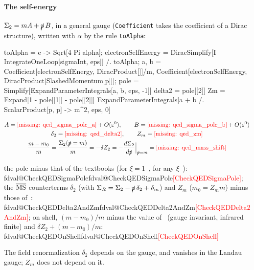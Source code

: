 \documentclass[11pt,a4paper]{article}
\makeatletter
\newcommand{\formula}[1]{\IfFileExists{figures/formula_#1.tex}{}{\text{\textcolor{red}{[missing: \detokenize{#1}]}}}}
\newcommand{\pkg}[1]{\texttt{#1}}
\newcommand{\val}[1]{\ifcsname fdval@#1\endcsname\csname fdval@#1\endcsname\else\textcolor{red}{[#1]}\fi}
\makeatother
\begin{document}
\paragraph{The self-energy} $\Sigma_2=mA+\slashed{p}\,B$, in a general gauge (\pkg{Coefficient} takes the coefficient of
a Dirac structure), written with $\alpha$ by the rule \pkg{toAlpha}:
\begin{code}
toAlpha = e -> Sqrt[4 Pi alpha];
electronSelfEnergy = DiracSimplify[I IntegrateOneLoop[sigmaInt, eps]] /. toAlpha;
{a, b} = {Coefficient[electronSelfEnergy, DiracProduct[]]/m,
    Coefficient[electronSelfEnergy, DiracProduct[SlashedMomentum[p]]]};
pole = Simplify[ExpandParameterIntegrals[{a, b}, eps, -1]]
delta2 = pole[[2]]
Zm = Expand[1 - pole[[1]] - pole[[2]]]
ExpandParameterIntegrals[a + b /. ScalarProduct[p, p] -> m^2, eps, 0]
\end{code}
\begin{outputbox}
\vspace{-6pt}
\begin{gather*}
A=\formula{qed_sigma_pole_a}+O(\varepsilon^0),\qquad B=\formula{qed_sigma_pole_b}+O(\varepsilon^0)\\
\delta_2=\formula{qed_delta2},\qquad Z_m=\formula{qed_zm}\\
\frac{m-m_0}{m}=\frac{\Sigma_2(\slashed{p}=m)}{m}=-\delta Z_2=-\frac{d\Sigma_2}{d\slashed{p}}\Big|_{\slashed{p}=m}
=\formula{qed_mass_shift}
\end{gather*}
\end{outputbox}
\begin{result}
the pole minus that of the textbooks (for $\xi=1$~\cite[section~10.3]{PeskinSchroeder}, for any
$\xi$~\cite[eqs.~(3.64) and (3.104)]{Grozin2005}): \val{CheckQEDSigmaPole}; the $\overline{\rm MS}$ counterterms $\delta_2$ (with
$\Sigma_R=\Sigma_2-\slashed{p}\,\delta_2+\delta_m$) and $Z_m$ ($m_0=Z_mm$) minus those
of~\cite[eqs.~(3.64) and (3.104)]{Grozin2005}: \val{CheckQEDDelta2AndZm}; on shell, $(m-m_0)/m$ minus the value
of~\cite[section~10.3]{PeskinSchroeder} (gauge invariant, infrared finite) and $\delta Z_2+(m-m_0)/m$: \val{CheckQEDOnShell}
\end{result}
The field renormalization $\delta_2$ depends on the gauge, and vanishes in the Landau gauge; $Z_m$ does not depend on it.
\end{document}
